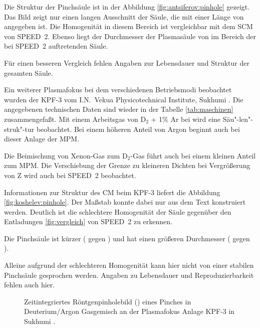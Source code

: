 %
\par
Die Struktur der Pinchsäule ist in der Abbildung
\vref{fig:antsiferov:pinhole} gezeigt. Das Bild zeigt nur einen
 langen Ausschnitt der Säule, die mit einer Länge von
 angegeben ist. Die Homogenität in diesem Bereich
ist vergleichbar mit dem SCM von SPEED~2. Ebenso liegt der
Durchmesser der Plasmasäule von  im Bereich der
bei SPEED~2 auftretenden Säule.
\par
Für einen besseren Vergleich fehlen Angaben zur Lebensdauer und
Struktur der gesamten Säule.
\par
Ein weiterer Plasmafokus bei dem verschiedenen Betriebsmodi
beobachtet wurden der KPF-3 vom I.N.~Vekua Physicotechnical
Institute, Sukhumi \cite{koshelev:90}. Die angegebenen technischen
Daten sind wieder in der Tabelle \vref{tab:maschinen}
zusammengefaßt. Mit einem Arbeitsgas von D$_2$ + 1\% Ar bei
 wird eine Säu"-len"-struk"-tur beobachtet. Bei
einem höheren Anteil von Argon beginnt auch bei dieser Anlage der
MPM.
\par
Die Beimischung von Xenon-Gas zum D$_2$-Gas führt auch bei einem
kleinen Anteil zum MPM. Die Verschiebung der Grenze zu kleineren
Dichten bei Vergrößerung von Z wird auch bei SPEED~2 beobachtet.
\par
Informationen zur Struktur des CM beim KPF-3 liefert die Abbildung
\vref{fig:koshelev:pinhole}. Der Maßstab konnte dabei nur aus dem Text
konstruiert werden. Deutlich ist die schlechtere Homogenität der Säule
gegenüber den Entladungen \vref{fig:vergleich} von SPEED~2 zu erkennen.
\par
Die Pinchsäule ist kürzer ( gegen ) und hat
einen größeren Durchmesser ( gegen ).
\par
Alleine aufgrund der schlechteren Homogenität kann hier nicht von einer
stabilen Pinchsäule gesprochen werden. Angaben zu Lebensdauer und
Reproduzierbarkeit fehlen auch hier.
%
\par
\begin{figure}[H]
  \center
  \caption{Zeitintegriertes Röntgenpinholebild () eines Pinches in
  Deuterium/Argon Gasgemisch an der Plasmafokus Anlage KPF-3 in Sukhumi \cite{koshelev:90}.}
  \label{fig:koshelev:pinhole}
\end{figure}
